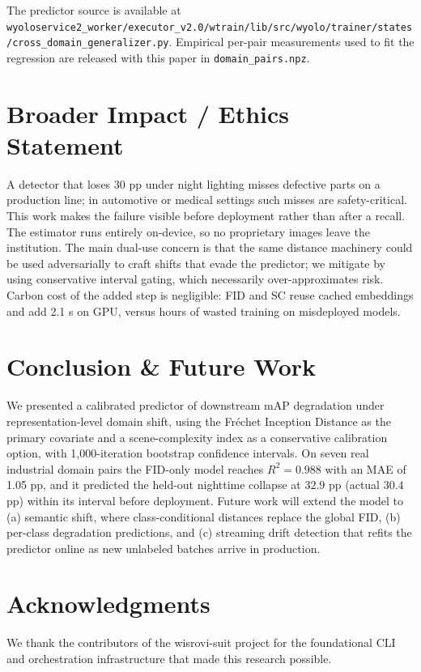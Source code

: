 \documentclass[10pt,twocolumn,letterpaper]{article}
\begin{document}
The predictor source is available at \texttt{wyoloservice2\_worker/executor\_v2.0/wtrain/lib/src/wyolo/trainer/states/cross\_domain\_generalizer.py}. Empirical per-pair measurements used to fit the regression are released with this paper in \texttt{domain\_pairs.npz}.

\section{Broader Impact / Ethics Statement}
A detector that loses 30 pp under night lighting misses defective parts on a production line; in automotive or medical settings such misses are safety-critical. This work makes the failure visible before deployment rather than after a recall. The estimator runs entirely on-device, so no proprietary images leave the institution. The main dual-use concern is that the same distance machinery could be used adversarially to craft shifts that evade the predictor; we mitigate by using conservative interval gating, which necessarily over-approximates risk. Carbon cost of the added step is negligible: FID and SC reuse cached embeddings and add 2.1 s on GPU, versus hours of wasted training on misdeployed models.

\section{Conclusion \& Future Work}
We presented a calibrated predictor of downstream mAP degradation under representation-level domain shift, using the Fr\'echet Inception Distance as the primary covariate and a scene-complexity index as a conservative calibration option, with 1,000-iteration bootstrap confidence intervals. On seven real industrial domain pairs the FID-only model reaches $R^2 = 0.988$ with an MAE of 1.05 pp, and it predicted the held-out nighttime collapse at $32.9$ pp (actual $30.4$ pp) within its interval before deployment. Future work will extend the model to (a) semantic shift, where class-conditional distances replace the global FID, (b) per-class degradation predictions, and (c) streaming drift detection that refits the predictor online as new unlabeled batches arrive in production.

\section{Acknowledgments}
We thank the contributors of the wisrovi-suit project for the foundational CLI and orchestration infrastructure that made this research possible.



\end{document}
